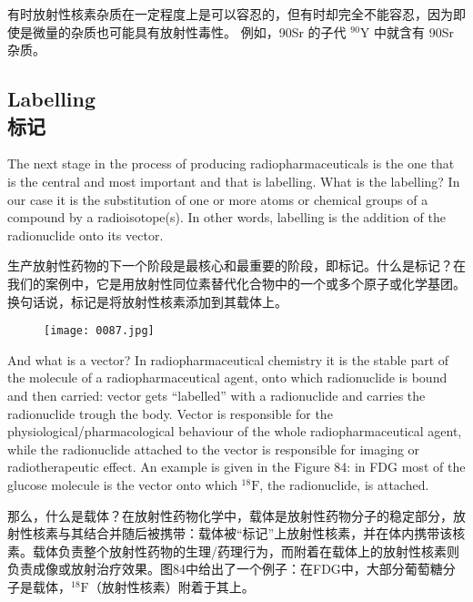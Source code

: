 \documentclass[dvipsnames, svgnames,a4paper,11pt]{article}
\begin{document}
有时放射性核素杂质在一定程度上是可以容忍的，但有时却完全不能容忍，因为即使是微量的杂质也可能具有放射性毒性。 例如，90Sr 的子代 \(\mathrm{{}^{90}Y}\) 中就含有 90Sr 杂质。

\subsection{Labelling \\标记}

The next stage in the process of producing radiopharmaceuticals is the one that is
the central and most important and that is labelling. What is the labelling? In our
case it is the substitution of one or more atoms or chemical groups of a compound
by a radioisotope(s). In other words, labelling is the addition of the radionuclide onto
its vector.

生产放射性药物的下一个阶段是最核心和最重要的阶段，即标记。什么是标记？在我们的案例中，它是用放射性同位素替代化合物中的一个或多个原子或化学基团。换句话说，标记是将放射性核素添加到其载体上。

\begin{figure}[H]
    \centering
    \texttt{[image: 0087.jpg]}
     \label{fig84}
\end{figure}

And what is a vector? In radiopharmaceutical chemistry it is the stable part of the
molecule of a radiopharmaceutical agent, onto which radionuclide is bound and then
carried: vector gets “labelled” with a radionuclide and carries the radionuclide trough the body. Vector is responsible for the physiological/pharmacological behaviour of
the whole radiopharmaceutical agent, while the radionuclide attached to the vector is
responsible for imaging or radiotherapeutic effect. An example is given in the Figure
84: in FDG most of the glucose molecule is the vector onto which ${}^{18}\mathrm{F}$, the
radionuclide, is attached.

那么，什么是载体？在放射性药物化学中，载体是放射性药物分子的稳定部分，放射性核素与其结合并随后被携带：载体被“标记”上放射性核素，并在体内携带该核素。载体负责整个放射性药物的生理/药理行为，而附着在载体上的放射性核素则负责成像或放射治疗效果。图84中给出了一个例子：在FDG中，大部分葡萄糖分子是载体，${}^{18}\mathrm{F}$（放射性核素）附着于其上。
\end{document}
